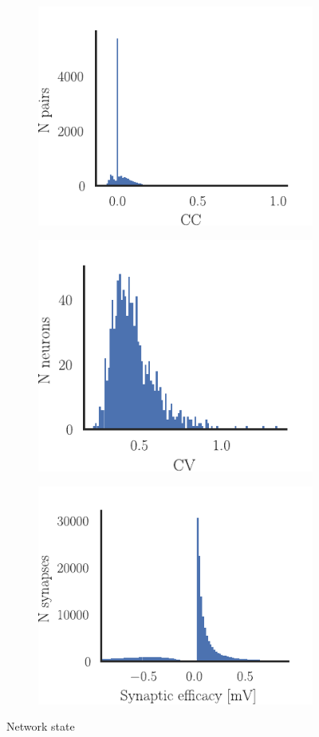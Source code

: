 \documentclass[11pt]{article}
\begin{document}
\begin{figure}
\makeatletter
\renewcommand\p@subfigure{}
\makeatother
\begin{subfigure}{0.485\textwidth} \includegraphics[scale=1]{CC}
\caption{} \label{fig:CC}
\end{subfigure}\hfill
\begin{subfigure}{0.485\textwidth} \includegraphics[scale=1]{CV}
\caption{} \label{fig:CV}
\end{subfigure}\medskip

\begin{subfigure}{\textwidth}\centering \includegraphics[scale=1]{syn_dist}
\caption{} \label{fig:syn_dist}
\end{subfigure}
\caption{Network state \label{fig:state}}
\end{figure}
\end{document}
